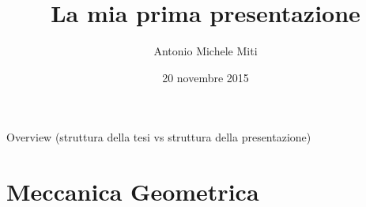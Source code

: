 \documentclass{beamer}
\title{La mia prima presentazione}
\author{Antonio Michele Miti}
\date{20 novembre 2015}
\begin{document}
	\begin{frame} %
		\maketitle
	\end{frame}

	\begin{frame}{Overview}
		(struttura della tesi vs struttura della presentazione)
		\tableofcontents
	\end{frame}

	

	\section{Meccanica Geometrica}
		\frame{\sectionpage}
	
\end{document}
